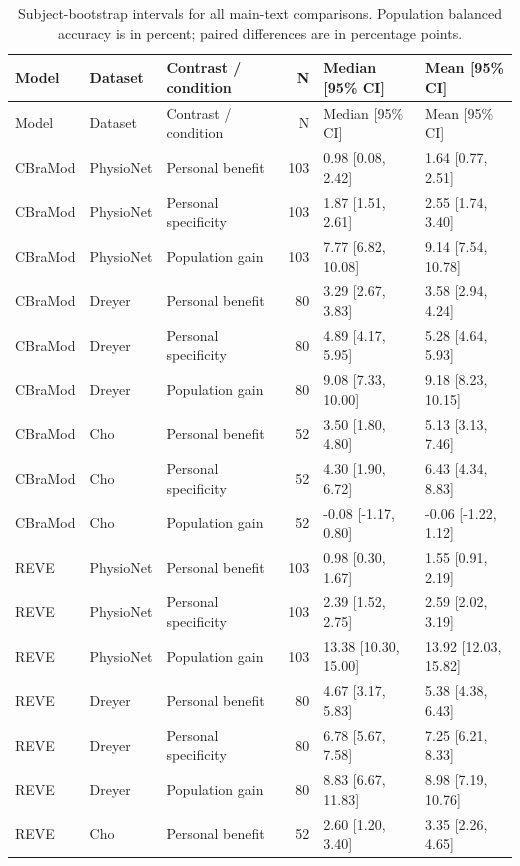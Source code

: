 \begin{longtable}{p{.65in}p{.60in}p{1.9in}rp{1.20in}p{1.20in}}
\caption{Subject-bootstrap intervals for all main-text comparisons. Population balanced accuracy is in percent; paired differences are in percentage points.}\label{tab:bootstrap_intervals}\\
\toprule
Model & Dataset & Contrast / condition & N & Median [95\% CI] & Mean [95\% CI] \\
\midrule
\endfirsthead
\toprule
Model & Dataset & Contrast / condition & N & Median [95\% CI] & Mean [95\% CI] \\
\midrule
\endhead
CBraMod & PhysioNet & Personal benefit & 103 & 0.98 [0.08, 2.42] & 1.64 [0.77, 2.51] \\
CBraMod & PhysioNet & Personal specificity & 103 & 1.87 [1.51, 2.61] & 2.55 [1.74, 3.40] \\
CBraMod & PhysioNet & Population gain & 103 & 7.77 [6.82, 10.08] & 9.14 [7.54, 10.78] \\
CBraMod & Dreyer & Personal benefit & 80 & 3.29 [2.67, 3.83] & 3.58 [2.94, 4.24] \\
CBraMod & Dreyer & Personal specificity & 80 & 4.89 [4.17, 5.95] & 5.28 [4.64, 5.93] \\
CBraMod & Dreyer & Population gain & 80 & 9.08 [7.33, 10.00] & 9.18 [8.23, 10.15] \\
CBraMod & Cho & Personal benefit & 52 & 3.50 [1.80, 4.80] & 5.13 [3.13, 7.46] \\
CBraMod & Cho & Personal specificity & 52 & 4.30 [1.90, 6.72] & 6.43 [4.34, 8.83] \\
CBraMod & Cho & Population gain & 52 & -0.08 [-1.17, 0.80] & -0.06 [-1.22, 1.12] \\
REVE & PhysioNet & Personal benefit & 103 & 0.98 [0.30, 1.67] & 1.55 [0.91, 2.19] \\
REVE & PhysioNet & Personal specificity & 103 & 2.39 [1.52, 2.75] & 2.59 [2.02, 3.19] \\
REVE & PhysioNet & Population gain & 103 & 13.38 [10.30, 15.00] & 13.92 [12.03, 15.82] \\
REVE & Dreyer & Personal benefit & 80 & 4.67 [3.17, 5.83] & 5.38 [4.38, 6.43] \\
REVE & Dreyer & Personal specificity & 80 & 6.78 [5.67, 7.58] & 7.25 [6.21, 8.33] \\
REVE & Dreyer & Population gain & 80 & 8.83 [6.67, 11.83] & 8.98 [7.19, 10.76] \\
REVE & Cho & Personal benefit & 52 & 2.60 [1.20, 3.40] & 3.35 [2.26, 4.65] \\

\end{longtable}
